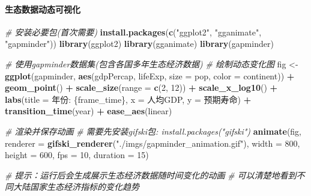 \documentclass[
]{book}
\newenvironment{Shaded}{\begin{snugshade}}{\end{snugshade}}
\newcommand{\AttributeTok}[1]{\textcolor[rgb]{0.13,0.29,0.53}{#1}}
\newcommand{\CommentTok}[1]{\textcolor[rgb]{0.56,0.35,0.01}{\textit{#1}}}
\newcommand{\DecValTok}[1]{\textcolor[rgb]{0.00,0.00,0.81}{#1}}
\newcommand{\FunctionTok}[1]{\textcolor[rgb]{0.13,0.29,0.53}{\textbf{#1}}}
\newcommand{\NormalTok}[1]{#1}
\newcommand{\OtherTok}[1]{\textcolor[rgb]{0.56,0.35,0.01}{#1}}
\newcommand{\SpecialCharTok}[1]{\textcolor[rgb]{0.81,0.36,0.00}{\textbf{#1}}}
\newcommand{\StringTok}[1]{\textcolor[rgb]{0.31,0.60,0.02}{#1}}
\begin{document}
\hypertarget{ux751fux6001ux6570ux636eux52a8ux6001ux53efux89c6ux5316}{%
\paragraph{生态数据动态可视化}\label{ux751fux6001ux6570ux636eux52a8ux6001ux53efux89c6ux5316}}

\begin{Shaded}
\begin{Highlighting}[]
\CommentTok{\# 安装必要包(首次需要)}
\FunctionTok{install.packages}\NormalTok{(}\FunctionTok{c}\NormalTok{(}\StringTok{"ggplot2"}\NormalTok{, }\StringTok{"gganimate"}\NormalTok{, }\StringTok{"gapminder"}\NormalTok{))}
\FunctionTok{library}\NormalTok{(ggplot2)}
\FunctionTok{library}\NormalTok{(gganimate)}
\FunctionTok{library}\NormalTok{(gapminder)}

\CommentTok{\# 使用gapminder数据集(包含各国多年生态经济数据)}
\CommentTok{\# 绘制动态变化图}
\NormalTok{fig }\OtherTok{\textless{}{-}} \FunctionTok{ggplot}\NormalTok{(gapminder, }\FunctionTok{aes}\NormalTok{(gdpPercap, lifeExp, }\AttributeTok{size =}\NormalTok{ pop, }\AttributeTok{color =}\NormalTok{ continent)) }\SpecialCharTok{+}
  \FunctionTok{geom\_point}\NormalTok{() }\SpecialCharTok{+}
  \FunctionTok{scale\_size}\NormalTok{(}\AttributeTok{range =} \FunctionTok{c}\NormalTok{(}\DecValTok{2}\NormalTok{, }\DecValTok{12}\NormalTok{)) }\SpecialCharTok{+}
  \FunctionTok{scale\_x\_log10}\NormalTok{() }\SpecialCharTok{+}
  \FunctionTok{labs}\NormalTok{(}\AttributeTok{title =} \StringTok{\textquotesingle{}年份: \{frame\_time\}\textquotesingle{}}\NormalTok{, }\AttributeTok{x =} \StringTok{\textquotesingle{}人均GDP\textquotesingle{}}\NormalTok{, }\AttributeTok{y =} \StringTok{\textquotesingle{}预期寿命\textquotesingle{}}\NormalTok{) }\SpecialCharTok{+}
  \FunctionTok{transition\_time}\NormalTok{(year) }\SpecialCharTok{+}
  \FunctionTok{ease\_aes}\NormalTok{(}\StringTok{\textquotesingle{}linear\textquotesingle{}}\NormalTok{)}

\CommentTok{\# 渲染并保存动画}
\CommentTok{\# 需要先安装gifski包: install.packages("gifski")}
\FunctionTok{animate}\NormalTok{(fig, }\AttributeTok{renderer =} \FunctionTok{gifski\_renderer}\NormalTok{(}\StringTok{"./imgs/gapminder\_animation.gif"}\NormalTok{), }
        \AttributeTok{width =} \DecValTok{800}\NormalTok{, }\AttributeTok{height =} \DecValTok{600}\NormalTok{, }\AttributeTok{fps =} \DecValTok{10}\NormalTok{, }\AttributeTok{duration =} \DecValTok{15}\NormalTok{)}

\CommentTok{\# 提示：运行后会生成展示生态经济数据随时间变化的动画}
\CommentTok{\# 可以清楚地看到不同大陆国家生态经济指标的变化趋势}
\end{Highlighting}
\end{Shaded}
\end{document}
